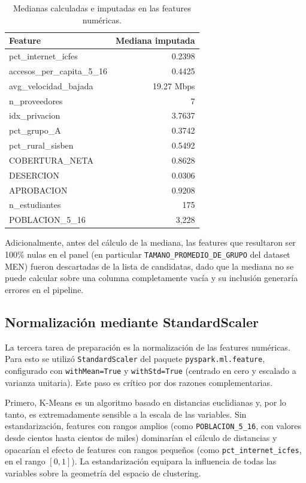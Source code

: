 \begin{table}[H]
\centering
\caption{Medianas calculadas e imputadas en las features numéricas.}
\begin{tabular}{l r}
\toprule
\textbf{Feature} & \textbf{Mediana imputada} \\
\midrule
pct\_internet\_icfes          & 0.2398 \\
accesos\_per\_capita\_5\_16   & 0.4425 \\
avg\_velocidad\_bajada        & 19.27 Mbps \\
n\_proveedores                & 7 \\
idx\_privacion                & 3.7637 \\
pct\_grupo\_A                 & 0.3742 \\
pct\_rural\_sisben            & 0.5492 \\
COBERTURA\_NETA               & 0.8628 \\
DESERCION                     & 0.0306 \\
APROBACION                    & 0.9208 \\
n\_estudiantes                & 175 \\
POBLACION\_5\_16              & 3,228 \\
\bottomrule
\end{tabular}
\end{table}

Adicionalmente, antes del cálculo de la mediana, las features que resultaron ser 100\% nulas en el panel (en particular \texttt{TAMANO\_PROMEDIO\_DE\_GRUPO} del dataset MEN) fueron descartadas de la lista de candidatas, dado que la mediana no se puede calcular sobre una columna completamente vacía y su inclusión generaría errores en el pipeline.

\subsection{Normalización mediante StandardScaler}
La tercera tarea de preparación es la normalización de las features numéricas. Para esto se utilizó \texttt{StandardScaler} del paquete \texttt{pyspark.ml.feature}, configurado con \texttt{withMean=True} y \texttt{withStd=True} (centrado en cero y escalado a varianza unitaria). Este paso es crítico por dos razones complementarias.

Primero, K-Means es un algoritmo basado en distancias euclidianas y, por lo tanto, es extremadamente sensible a la escala de las variables. Sin estandarización, features con rangos amplios (como \texttt{POBLACION\_5\_16}, con valores desde cientos hasta cientos de miles) dominarían el cálculo de distancias y opacarían el efecto de features con rangos pequeños (como \texttt{pct\_internet\_icfes}, en el rango $[0, 1]$). La estandarización equipara la influencia de todas las variables sobre la geometría del espacio de clustering.

